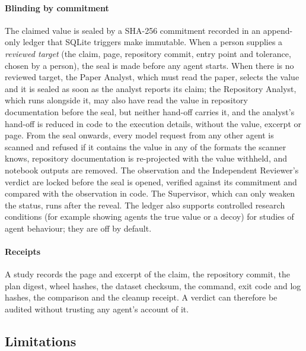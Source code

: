\documentclass[preprint,12pt]{elsarticle}
\begin{document}
\paragraph{Blinding by commitment}
The claimed value is sealed by a SHA-256 commitment recorded in an append-only
ledger that SQLite triggers make immutable. When a person supplies a
\emph{reviewed target} (the claim, page, repository commit, entry point and
tolerance, chosen by a person), the seal is made before any agent starts. When
there is no reviewed target, the Paper Analyst, which must read the paper,
selects the value and it is sealed as soon as the analyst reports its claim;
the Repository Analyst, which runs alongside it, may also have read the value
in repository documentation before the seal, but neither hand-off carries it, and the analyst's hand-off is reduced in code to the execution
details, without the value, excerpt or page. From the seal onwards, every model
request from any other agent is scanned and refused if it contains the value in
any of the formats the scanner knows, repository documentation is re-projected with the value withheld, and notebook
outputs are removed. The observation and the
Independent Reviewer's verdict are locked before the seal is opened, verified
against its commitment and compared with the observation in code. The Supervisor, which can only weaken
the status, runs after the reveal. The ledger
also supports controlled research conditions (for example showing agents the
true value or a decoy) for studies of agent behaviour; they are off by default.

\paragraph{Receipts}
A study records the page and excerpt of the claim, the repository commit, the
plan digest, wheel hashes, the dataset checksum, the command, exit code and log
hashes, the comparison and the cleanup receipt. A verdict can therefore be
audited without trusting any agent's account of it.

\subsection{Limitations}
\end{document}
